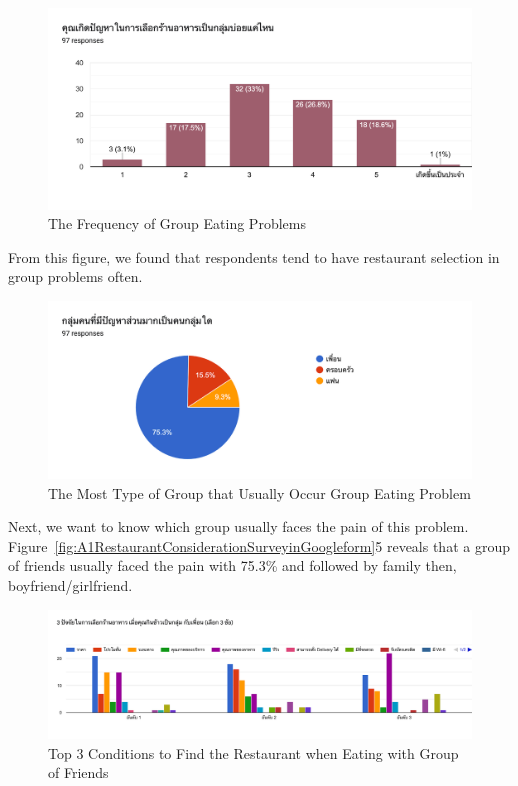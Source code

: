 \documentclass[12pt,oneside,openright,a4paper]{cpe-english-project}
\begin{document}
\begin{figure}[H]\centering
\includegraphics[width=350pt]{./images/A1TheFrequencyofGroupEatingProblems.png}
\caption{The Frequency of Group Eating Problems}\label{fig:A1TheFrequencyofGroupEatingProblems}
\end{figure}

From this figure, we found that respondents tend to have restaurant selection in group problems often.

\begin{figure}[H]\centering
\includegraphics[width=350pt]{./images/A1TheMostTypeofGroupthatUsuallyOccurGroupEatingProblem.png}
\caption{The Most Type of Group that Usually Occur Group Eating Problem}\label{fig:A1TheMostTypeofGroupthatUsuallyOccurGroupEatingProblem}
\end{figure}

Next, we want to know which group usually faces the pain of this problem. Figure~\ref{fig:A1RestaurantConsiderationSurveyinGoogleform}5 reveals that a group of friends usually faced the pain with 75.3\% and followed by family then, boyfriend/girlfriend.

\begin{figure}[H]\centering
\includegraphics[width=350pt]{./images/A1Top3ConditionstoFindtheRestaurantwhenEatingwithGroupofFriends.png}
\caption{Top 3 Conditions to Find the Restaurant when Eating with Group of Friends}\label{fig:A1Top3ConditionstoFindtheRestaurantwhenEatingwithGroupofFriends}
\end{figure}
\end{document}
